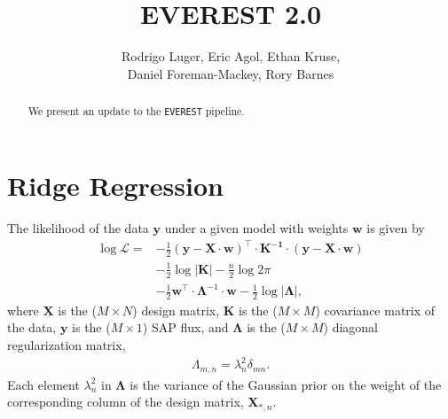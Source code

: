 \documentclass[]{emulateapj}
\begin{document}
\title{EVEREST 2.0}
\author{Rodrigo Luger, Eric Agol, Ethan Kruse, \\
Daniel Foreman-Mackey, Rory Barnes}

\begin{abstract}
We present an update to the \texttt{EVEREST} pipeline.
\end{abstract}

\section{Ridge Regression}
\label{sec:l2}
The likelihood of the data $\mathbf{y}$ under a given model with weights $\mathbf{w}$ is given by
\begin{align}
\label{eq:like}
\log\mathcal{L} =  &-\frac{1}{2} \left(\mathbf{y} - \mathbf{X} \cdot \mathbf{w}\right)^\top
                   \cdot
                   \mathbf{K^{-1}}
                   \cdot
                   \left(\mathbf{y} - \mathbf{X} \cdot \mathbf{w}\right) \nonumber\\  
                   &-\frac{1}{2} \log\left|\mathbf{K}\right| 
                   -\frac{n}{2}\log 2\pi \nonumber\\
                   &-\frac{1}{2}
                   \mathbf{w}^\top \cdot \mathbf{\Lambda}^{-1} \cdot \mathbf{w}
                   -\frac{1}{2} \log\left|\mathbf{\Lambda}\right|,
\end{align}
%
where $\mathbf{X}$ is the ($M \times N$) design matrix, $\mathbf{K}$ is the ($M \times M$) covariance matrix of the data, 
$\mathbf{y}$ is the ($M \times 1$) SAP flux, and $\mathbf{\Lambda}$ is the ($M \times M$) diagonal regularization matrix,
%
\begin{align}
\label{eq:Lambda}
\Lambda_{m,n} = \lambda_{n}^2\delta_{mn}.
\end{align}
%
Each element $\lambda_n^2$ in $\mathbf{\Lambda}$ is the variance of the 
Gaussian prior on the weight of the corresponding column of the design matrix, 
$\mathbf{X}_{*,n}$.
\end{document}
